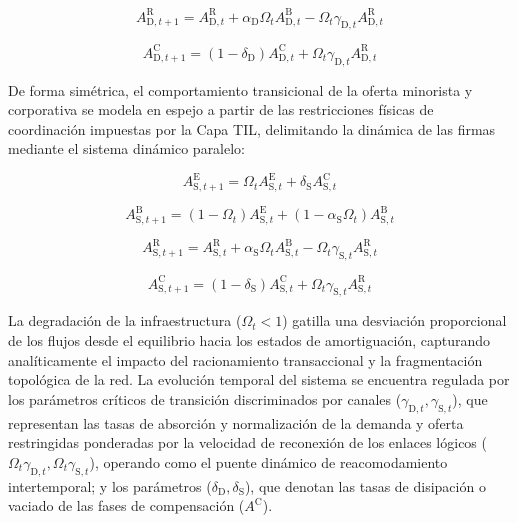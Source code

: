 \begin{equation}
    A^{\text{R}}_{\text{D}, t+1} = A^{\text{R}}_{\text{D}, t} + \alpha_{\text{D}} \Omega_t A^{\text{B}}_{\text{D}, t} - \Omega_t \gamma_{\text{D},t} A^{\text{R}}_{\text{D}, t}
    \label{eq:markov_demand_3}
\end{equation}

\begin{equation}
    A^{\text{C}}_{\text{D}, t+1} = (1 - \delta_{\text{D}}) A^{\text{C}}_{\text{D}, t} + \Omega_t \gamma_{\text{D},t} A^{\text{R}}_{\text{D}, t}
    \label{eq:markov_demand_4}
\end{equation}

De forma sim\'etrica, el comportamiento transicional de la oferta minorista y corporativa se modela en espejo a partir de las restricciones f\'isicas de coordinaci\'on impuestas por la Capa TIL, delimitando la din\'amica de las firmas mediante el sistema din\'amico paralelo:

\begin{equation}
    A^{\text{E}}_{\text{S}, t+1} = \Omega_t A^{\text{E}}_{\text{S}, t} + \delta_{\text{S}} A^{\text{C}}_{\text{S}, t}
    \label{eq:markov_supply_1}
\end{equation}

\begin{equation}
    A^{\text{B}}_{\text{S}, t+1} = (1 - \Omega_t) A^{\text{E}}_{\text{S}, t} + (1 - \alpha_{\text{S}} \Omega_t) A^{\text{B}}_{\text{S}, t}
    \label{eq:markov_supply_2}
\end{equation}

\begin{equation}
    A^{\text{R}}_{\text{S}, t+1} = A^{\text{R}}_{\text{S}, t} + \alpha_{\text{S}} \Omega_t A^{\text{B}}_{\text{S}, t} - \Omega_t \gamma_{\text{S},t} A^{\text{R}}_{\text{S}, t}
    \label{eq:markov_supply_3}
\end{equation}

\begin{equation}
    A^{\text{C}}_{\text{S}, t+1} = (1 - \delta_{\text{S}}) A^{\text{C}}_{\text{S}, t} + \Omega_t \gamma_{\text{S},t} A^{\text{R}}_{\text{S}, t}
    \label{eq:markov_supply_4}
\end{equation}

La degradaci\'on de la infraestructura ($\Omega_t < 1$) gatilla una desviaci\'on proporcional de los flujos desde el equilibrio hacia los estados de amortiguaci\'on, capturando anal\'iticamente el impacto del racionamiento transaccional y la fragmentaci\'on topol\'ogica de la red. La evoluci\'on temporal del sistema se encuentra regulada por los par\'ametros cr\'iticos de transici\'on discriminados por canales ($\gamma_{\text{D},t}, \gamma_{\text{S},t}$), que representan las tasas de absorci\'on y normalizaci\'on de la demanda y oferta restringidas ponderadas por la velocidad de reconexi\'on de los enlaces l\'ogicos ($\Omega_t \gamma_{\text{D},t}, \Omega_t \gamma_{\text{S},t}$), operando como el puente din\'amico de reacomodamiento intertemporal; y los par\'ametros ($\delta_{\text{D}}, \delta_{\text{S}}$), que denotan las tasas de disipaci\'on o vaciado de las fases de compensaci\'on ($A^{\text{C}}$). 

